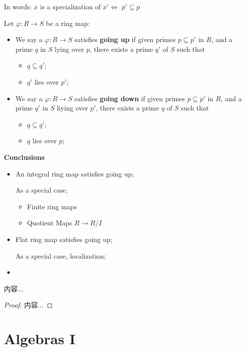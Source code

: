 \documentclass[Total.tex]{subfiles}
\begin{document}
			In words: $x$ is a specialization of $x'\Leftrightarrow$ $p'\subseteq p$
			\begin{Def}
				Let $\varphi:R\rightarrow S$ be a ring map:
				\begin{itemize}
					\item We say a $\varphi:R\rightarrow S$ satisfies \textbf{going up} if given primes $p\subseteq p'$ in $R$, and a prime $q$ in $S$ lying over $p$, there exists a prime $q'$ of $S$ such that
					\begin{itemize}
						\item $q\subseteq q'$;
						\item $q'$ lies over $p'$;
					\end{itemize}
					
					\item We say a $\varphi:R\rightarrow S$ satisfies \textbf{going down} if given primes $p\subseteq p'$ in $R$, and a prime $q'$ in $S$ liying over $p'$, there exists a prime $q$ of $S$ such that
					\begin{itemize}
						\item $q\subseteq q'$;
						\item $q$ lies over $p$;
					\end{itemize}
				\end{itemize}
			\end{Def}
			
			\textbf{Conclusions}
			\begin{itemize}
				\item An integral ring map satisfies going up;
				
				As a special case,
				\begin{itemize}
					\item Finite ring maps
					\item Quotient Maps $R\rightarrow R/I$
				\end{itemize}
				\item Flat ring map satisfies going up;
				
				As a special case, localization;
				\item 
			\end{itemize}
			
			\begin{lemma}
				内容...
			\end{lemma}
			\begin{proof}
				内容...
			\end{proof}
	\chapter{Algebras I}
\end{document}
